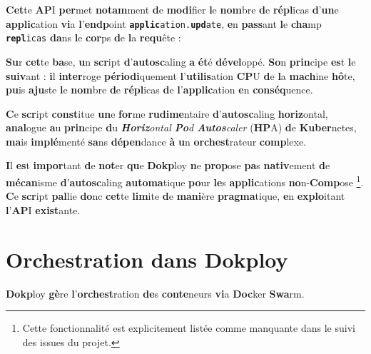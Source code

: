 \documentclass{rapportClass} %
\begin{document}
\textbf{Cet}te \textbf{AP}I \textbf{per}met \textbf{notam}ment \textbf{d}e \textbf{modi}fier \textbf{l}e \textbf{nom}bre \textbf{d}e \textbf{répl}icas \textbf{d}'\textbf{un}e
\textbf{applic}ation \textbf{vi}a \textbf{l}'\textbf{endp}oint \texttt{\textbf{applic}ation.\textbf{upd}ate}, \textbf{e}n \textbf{pass}ant
\textbf{l}e \textbf{cha}mp \texttt{\textbf{repl}icas} \textbf{da}ns \textbf{l}e \textbf{cor}ps \textbf{d}e \textbf{l}a \textbf{requ}ête :

\textbf{Su}r \textbf{cet}te \textbf{ba}se, \textbf{u}n \textbf{scr}ipt \textbf{d}'\textbf{autosc}aling \textbf{a} \textbf{ét}é \textbf{dével}oppé. \textbf{So}n
\textbf{prin}cipe \textbf{es}t \textbf{l}e \textbf{suiv}ant : \textbf{i}l \textbf{inter}roge \textbf{périodi}quement \textbf{l}'\textbf{utilis}ation
\textbf{CP}U \textbf{d}e \textbf{l}a \textbf{mach}ine \textbf{hô}te, \textbf{pu}is \textbf{aju}ste \textbf{l}e \textbf{nom}bre \textbf{d}e \textbf{répl}icas \textbf{d}e
\textbf{l}'\textbf{applic}ation \textbf{e}n \textbf{conséq}uence.

\textbf{C}e \textbf{scr}ipt \textbf{const}itue \textbf{un}e \textbf{for}me \textbf{rudime}ntaire \textbf{d}'\textbf{autosc}aling \textbf{horiz}ontal,
\textbf{anal}ogue \textbf{a}u \textbf{prin}cipe \textbf{d}u \textit{\textbf{Horiz}ontal \textbf{Po}d \textbf{Autos}caler} (\textbf{HP}A) \textbf{d}e
\textbf{Kuber}netes, \textbf{ma}is \textbf{implé}menté \textbf{sa}ns \textbf{dépen}dance \textbf{à} \textbf{u}n \textbf{orchest}rateur
\textbf{comp}lexe.

\textbf{I}l \textbf{es}t \textbf{impor}tant \textbf{d}e \textbf{not}er \textbf{qu}e \textbf{Dokp}loy \textbf{n}e \textbf{prop}ose \textbf{pa}s \textbf{nativ}ement \textbf{d}e
\textbf{mécan}isme \textbf{d}'\textbf{autosc}aling \textbf{automa}tique \textbf{po}ur \textbf{le}s \textbf{applic}ations \textbf{no}n-\textbf{Comp}ose
\footnote{Cette fonctionnalité est explicitement listée comme manquante
dans le suivi des issues du projet.}. \textbf{C}e \textbf{scr}ipt \textbf{pal}lie \textbf{do}nc \textbf{cet}te
\textbf{lim}ite \textbf{d}e \textbf{mani}ère \textbf{pragma}tique, \textbf{e}n \textbf{explo}itant \textbf{l}'\textbf{AP}I \textbf{exist}ante.

\section{Orchestration dans Dokploy}
\textbf{Dokp}loy \textbf{gè}re \textbf{l}'\textbf{orchest}ration \textbf{de}s \textbf{conte}neurs \textbf{vi}a \textbf{Doc}ker \textbf{Swa}rm.
\end{document}
